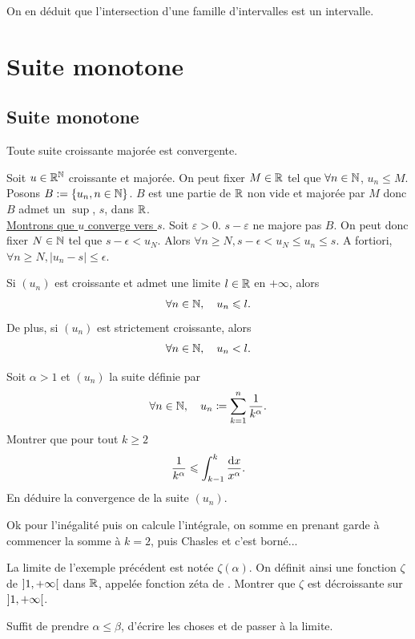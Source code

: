 \documentclass{magnoliaold}
\begin{document}
\begin{remarqueUnique}
\remarque On en déduit que l'intersection d'une famille d'intervalles est un intervalle.
\end{remarqueUnique}


\section{Suite monotone}

\subsection{Suite monotone}

\begin{theoreme}[nom={Théorème de la limite monotone}]
Toute suite croissante majorée est convergente.
\end{theoreme}

\begin{preuve}
Soit $u\in \R^{\N}$ croissante et majorée. On peut fixer $M\in\R$ tel que $\forall n\in \N$, $u_n\leq M$. Posons $B:=\ens{u_n, n\in \N}$. $B$ est une partie de $\R$ non vide et majorée par $M$ donc $B$ admet un $\sup$, $s$, dans $\R$.\\
\underline{Montrons que $u$ converge vers $s$}. Soit $\varepsilon>0$. $s-\varepsilon$ ne majore pas $B$. On peut donc fixer $N\in\N$ tel que $s-\epsilon<u_N$. Alors $\forall n\geq N, s-\epsilon<u_N\leq u_n\leq s$. A fortiori, $\forall n\geq N, |u_n-s|\leq \epsilon$.
\end{preuve}

\begin{remarqueUnique}
\remarque Si $(u_n)$ est croissante et admet une limite $l\in\R$ en $+\infty$, alors
  \[\forall n\in\N\qsep u_n\leq l.\]
  De plus, si $(u_n)$ est strictement croissante, alors
  \[\forall n\in\N\qsep u_n< l.\]
\end{remarqueUnique}


\begin{exos}
\exo Soit $\alpha>1$ et $(u_n)$ la suite définie par
  \[\forall n\in\N \qsep u_n\defeq\sum_{k=1}^n \frac{1}{k^\alpha}.\]
  Montrer que pour tout $k\geq 2$
  \[\frac{1}{k^\alpha}\leq\integinv{k-1}{k}{x^\alpha}{x}.\]
  En déduire la convergence de la suite $(u_n)$.
  \begin{sol}
  Ok pour l'inégalité puis on calcule l'intégrale, on somme en prenant garde à commencer la somme à $k=2$, puis Chasles et c'est borné...
  \end{sol}
\exo La limite de l'exemple précédent est notée $\zeta(\alpha)$. On
  définit ainsi une fonction $\zeta$ de $\intero{1}{+\infty}$ dans $\R$,
  appelée fonction zéta de . Montrer que $\zeta$ est
  décroissante sur $\intero{1}{+\infty}$.
  \begin{sol}
  Suffit de prendre $\alpha\leq \beta$, d'écrire les choses et de passer à la limite.
  \end{sol}
\end{exos}
\end{document}

